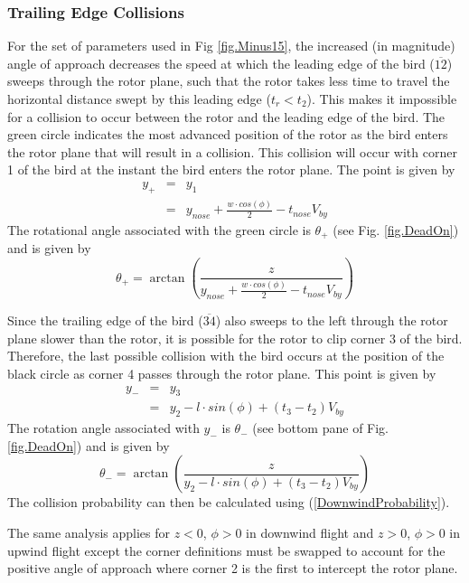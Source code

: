 \label{} \documentclass[10pt,conference]{IEEEtran}
\begin{document}
\subsubsection{Trailing Edge Collisions} For the set of parameters used in Fig \ref{fig.Minus15}, the increased (in magnitude) angle of
approach decreases the speed at which the leading edge of the bird ($\overline{12}$) sweeps through the rotor plane,
such that the rotor takes less time to travel the horizontal distance swept by this leading edge ($t_r<t_2$). This
makes it impossible for a collision to occur between the rotor and the leading edge of the bird. The green circle
indicates the most advanced position of the rotor as the bird enters the rotor plane that will result in a collision.
This collision will occur with corner 1 of the bird at the instant the bird enters the rotor plane. The point is given
by
\begin{eqnarray}
    \nonumber y_+ &=& y_1\\
    &=& y_{nose}+\frac{w \cdot cos(\phi)}{2}-t_{nose}V_{by}
\end{eqnarray}
The rotational angle associated with the green circle is $\theta_+$ (see Fig. \ref{fig.DeadOn}) and is given by
\begin{equation}
    \theta_+ = \arctan\left(\frac{z}{y_{nose}+\frac{w \cdot cos(\phi)}{2}-t_{nose}V_{by}}\right)
\end{equation}

Since the trailing edge of the bird ($\overline{34}$) also sweeps to the left through the rotor plane slower than the
rotor, it is possible for the rotor to clip corner 3 of the bird. Therefore, the last possible collision with the bird
occurs at the position of the black circle as corner 4 passes through the rotor plane. This point is given by
\begin{eqnarray}
    \nonumber y_- &=& y_3\\
    &=& y_2-l \cdot sin(\phi) + (t_3-t_2)V_{by}
\end{eqnarray}
The rotation angle associated with $y_-$ is $\theta_-$ (see bottom pane of Fig. \ref{fig.DeadOn}) and is given by
\begin{equation}
    \theta_- = \arctan\left(\frac{z}{y_2-l \cdot sin(\phi) + (t_3-t_2)V_{by}}\right)
\end{equation}
The collision probability can then be calculated using (\ref{DownwindProbability}).

The same analysis applies for $z<0$, $\phi>0$ in downwind flight and $z>0$, $\phi>0$ in upwind flight except the corner
definitions must be swapped to account for the positive angle of approach where corner 2 is the first to intercept the
rotor plane.
\end{document}
